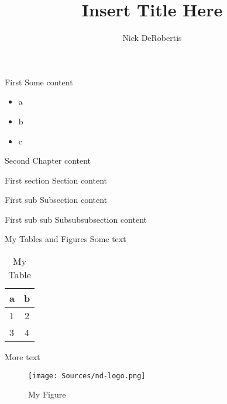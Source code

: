 \documentclass[]{uf-thesis-dissertation}
\title{Insert Title Here}
\author{Nick DeRobertis}
\begin{document}
\begin{chapter}{First}
Some content
\begin{itemize}
\item a
\item b
\item c
\end{itemize}
\end{chapter}
\begin{chapter}{Second}
Chapter content
\begin{section}{First section}
Section content
\begin{subsection}{First sub}
Subsection content
\begin{subsubsection}{First sub sub}
Subsubsubsection content
\end{subsubsection}
\end{subsection}
\end{section}
\end{chapter}
\begin{chapter}{My Tables and Figures}
Some text
\begin{table}
\centering
\begin{threeparttable}
\caption{My Table}
\begin{tabular}{lc}
\toprule
a & b\\
\midrule
1 & 2 \\
3 & 4 \\
\bottomrule

\end{tabular}
\end{threeparttable}
\end{table}
More text
\begin{figure}
\texttt{[image: Sources/nd-logo.png]}
\caption{My Figure}
\end{figure}
\end{chapter}
\end{document}
